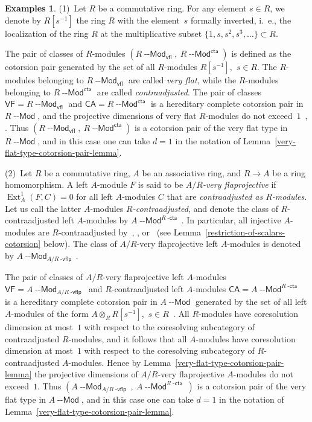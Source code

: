 \documentclass[12pt,a4paper]{amsart}
\newcommand{\+}{\nobreakdash-}
\renewcommand{\:}{\colon}
\newcommand{\rarrow}{\longrightarrow}
\newcommand{\ot}{\otimes}
\DeclareMathOperator{\Ext}{Ext}
\newcommand{\Modl}{{\operatorname{\mathsf{--Mod}}}}
\newcommand{\VF}{\mathsf{VF}}
\newcommand{\CA}{\mathsf{CA}}
\newcommand{\vfl}{\mathsf{vfl}}
\newcommand{\cta}{\mathsf{cta}}
\newcommand{\dcta}{{\operatorname{\mathsf{-cta}}}}
\newcommand{\dvflp}{{\operatorname{\mathsf{-vflp}}}}
\theoremstyle{plain}
\theoremstyle{definition}
\newtheorem{exs}[thm]{Examples}
\begin{document}
\begin{exs} \label{very-flat-and-very-flaprojective-in-modules-exs}
 (1)~Let $R$ be a commutative ring.
 For any element $s\in R$, we denote by $R[s^{-1}]$ the ring $R$ with
the element~$s$ formally inverted, i.~e., the localization of
the ring $R$ at the multiplicative subset $\{1,s,s^2,s^3,\dotsc\}
\subset R$.

 The pair of classes of $R$\+modules $(R\Modl_\vfl,\>R\Modl^\cta)$ is
defined as the cotorsion pair generated by the set of all $R$\+modules
$R[s^{-1}]$, \,$s\in R$.
 The $R$\+modules belonging to $R\Modl_\vfl$ are called \emph{very
flat}, while the $R$\+modules belonging to $R\Modl^\cta$ are called
\emph{contraadjusted}.
 The pair of classes $\VF=R\Modl_\vfl$ and $\CA=R\Modl^\cta$ is
a hereditary complete cotorsion pair in $R\Modl$, and the projective
dimensions of very flat $R$\+modules do not exceed~$1$
\,\cite[Section~1.1]{Pcosh}, \cite[Section~4.3]{Pphil}.
 Thus $(R\Modl_\vfl,\>R\Modl^\cta)$ is a cotorsion pair of the very flat
type in $R\Modl$, and in this case one can take $d=1$ in the notation
of Lemma~\ref{very-flat-type-cotorsion-pair-lemma}.
 
\smallskip
 (2)~Let $R$ be a commutative ring, $A$ be an associative ring, and
$R\rarrow A$ be a ring homomorphism.
 A left $A$\+module $F$ is said to be \emph{$A/R$\+very flaprojective}
if $\Ext^1_A(F,C)=0$ for all left $A$\+modules $C$ that are
\emph{contraadjusted as $R$\+modules}.
 Let us call the latter $A$\+modules \emph{$R$\+contraadjusted}, and
denote the class of $R$\+contraadjusted left $A$\+modules by
$A\Modl^{R\dcta}$.
 In particular, all injective $A$\+modules are $R$\+contraadjusted
by~\cite[Lemma~1.3.4(a)]{Pcosh}, \cite[Lemma~1.6(a)]{Pdomc},
or~\cite[Lemma~2.3]{PBas} (see
Lemma~\ref{restriction-of-scalars-cotorsion} below).
 The class of $A/R$\+very flaprojective left $A$\+modules is denoted
by $A\Modl_{A/R\dvflp}$.

 The pair of classes of $A/R$\+very flaprojective left $A$\+modules
$\VF=A\Modl_{A/R\dvflp}$ and $R$\+contraadjusted left $A$\+modules
$\CA=A\Modl^{R\dcta}$ is a hereditary complete cotorsion pair in
$A\Modl$ generated by the set of all left $A$\+modules of the form
$A\ot_RR[s^{-1}]$, \,$s\in R$ \,\cite[Section~1.6]{Pdomc}.
 All $R$\+modules have coresolution dimension at most~$1$ with respect
to the coresolving subcategory of contraadjusted $R$\+modules, and it
follows that all $A$\+modules have coresolution dimension at most~$1$
with respect to the coresolving subcategory of $R$\+contraadjusted
$A$\+modules.
 Hence by Lemma~\ref{very-flat-type-cotorsion-pair-lemma} the projective
dimensions of $A/R$\+very flaprojective $A$\+modules do not exceed~$1$.
 Thus $(A\Modl_{A/R\dvflp},\>A\Modl^{R\dcta})$ is a cotorsion pair of
the very flat type in $A\Modl$, and in this case one can take $d=1$ in
the notation of Lemma~\ref{very-flat-type-cotorsion-pair-lemma}.
\end{exs}
\end{document}
